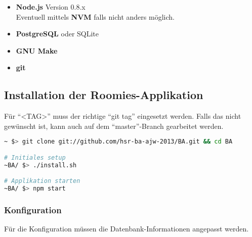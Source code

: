 \begin{itemize}
	\item \textbf{Node.js} Version 0.8.x \cite{nodejs}\\
		Eventuell mittels \textbf{NVM} \cite{NVM} falls nicht anders möglich.
	\item \textbf{PostgreSQL} \cite{PostgreSQL} oder SQLite \cite{SQLite}
	\item \textbf{GNU Make} \cite{GNUmake}
	\item \textbf{git} \cite{git}
\end{itemize}

\subsection*{Installation der Roomies-Applikation}

Für ``<TAG>'' muss der richtige ``git tag'' eingesetzt werden. Falls das nicht gewünscht ist, kann auch auf dem ``master''-Branch gearbeitet werden.

\begin{lstlisting}[language=Bash, caption=Installationsanleitung ohne Vagrant]
~ $> git clone git://github.com/hsr-ba-ajw-2013/BA.git && cd BA

# Initiales setup
~BA/ $> ./install.sh

# Applikation starten
~BA/ $> npm start
\end{lstlisting}

\subsubsection*{Konfiguration}
Für die Konfiguration müssen die Datenbank-Informationen angepasst werden.